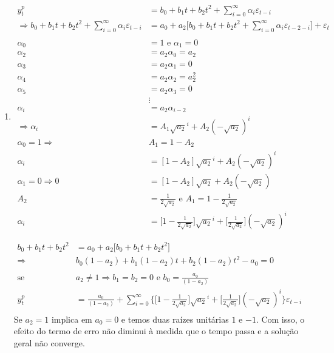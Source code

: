 \begin{enumerate}
\begin{enumerate}
 	\item %
 	
 	\begin{align*}
		 y_t^p&=b_0+b_1t+b_2t^2+\sum\limits_{i=0}^{\infty}\alpha_i\varepsilon_{t-i}\\
		 \Rightarrow b_0+b_1t+b_2t^2+\sum\limits_{i=0}^{\infty}\alpha_i\varepsilon_{t-i}&=a_0+a_2\bigg[b_0+b_1t+b_2t^2+\sum\limits_{i=0}^{\infty}\alpha_i\varepsilon_{t-2-i}\bigg]+\varepsilon_t\\
		 \\
		 \alpha_0&=1 \text{ e }\alpha_1=0\\
		 \alpha_2&=a_2\alpha_0=a_2\\
		 \alpha_3&=a_2\alpha_1=0\\
		 \alpha_4&=a_2\alpha_2=a_2^2\\
		 \alpha_5&=a_2\alpha_3=0\\
		 &\vdots\\
		 \alpha_i&=a_2\alpha_{i-2}\\
		 \Rightarrow \alpha_i&=A_1\sqrt{a_2}^i+A_2(-\sqrt{a_2})^i\\
		 \alpha_0=1 \Rightarrow & A_1=1-A_2\\
		 \alpha_i&=[1-A_2]\sqrt{a_2}^i+A_2(-\sqrt{a_2})^i\\
		 \alpha_1=0 \Rightarrow 0&=[1-A_2]\sqrt{a_2}+A_2(-\sqrt{a_2})\\
		 A_2&=\frac{1}{2\sqrt{a_2}} \text{ e } A_1=1-\frac{1}{2\sqrt{a_2}}\\
		 \alpha_i&=\bigg[1-\frac{1}{2\sqrt{a_2}}\bigg]\sqrt{a_2}^i+\bigg[\frac{1}{2\sqrt{a_2}}\bigg](-\sqrt{a_2})^i
		 \end{align*}
		 
		 \begin{align*}
		 b_0+b_1t+b_2t^2&=a_0+a_2\bigg[b_0+b_1t+b_2t^2\bigg]\\
		 \Rightarrow  &b_0(1-a_2)+b_1(1-a_2)t+b_2(1-a_2)t^2-a_0=0\\
		 \\
		 \text{se }& a_2\neq 1\Rightarrow b_1=b_2=0 \text{ e } b_0=\frac{a_0}{(1-a_2)}\\
		 y_t^p&=\frac{a_0}{(1-a_2)}+\sum\limits_{i=0}^{\infty}\Bigg\{\bigg[1-\frac{1}{2\sqrt{a_2}}\bigg]\sqrt{a_2}^i+\bigg[\frac{1}{2\sqrt{a_2}}\bigg](-\sqrt{a_2})^i\Bigg\}\varepsilon_{t-i}\\
		  \end{align*}
		  Se $a_2=1$ implica em $a_0=0$ e temos duas raízes unitárias $1$ e $-1$. Com isso, o efeito do termo de erro não diminui à medida que o tempo passa e a solução geral não converge.
		  

\end{enumerate}
\end{enumerate}
